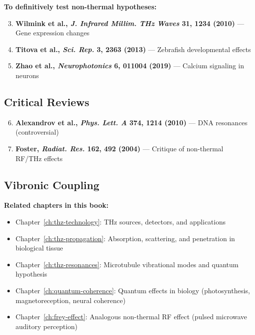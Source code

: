 \textbf{To definitively test non-thermal hypotheses:}
\begin{enumerate}
\setcounter{enumi}{2}
\item \textbf{Wilmink et al., \emph{J. Infrared Millim. THz Waves} 31, 1234 (2010)} --- Gene expression changes
\item \textbf{Titova et al., \emph{Sci. Rep.} 3, 2363 (2013)} --- Zebrafish developmental effects
\item \textbf{Zhao et al., \emph{Neurophotonics} 6, 011004 (2019)} --- Calcium signaling in neurons
\end{enumerate}

\subsection{Critical Reviews}

\begin{enumerate}
\setcounter{enumi}{5}
\item \textbf{Alexandrov et al., \emph{Phys. Lett. A} 374, 1214 (2010)} --- DNA resonances (controversial)
\item \textbf{Foster, \emph{Radiat. Res.} 162, 492 (2004)} --- Critique of non-thermal RF/THz effects
\end{enumerate}

\subsection{Vibronic Coupling}

\textbf{Related chapters in this book:}
\begin{itemize}
\item Chapter~\ref{ch:thz-technology}: THz sources, detectors, and applications
\item Chapter~\ref{ch:thz-propagation}: Absorption, scattering, and penetration in biological tissue
\item Chapter~\ref{ch:thz-resonances}: Microtubule vibrational modes and quantum hypothesis
\item Chapter~\ref{ch:quantum-coherence}: Quantum effects in biology (photosynthesis, magnetoreception, neural coherence)
\item Chapter~\ref{ch:frey-effect}: Analogous non-thermal RF effect (pulsed microwave auditory perception)
\end{itemize}

